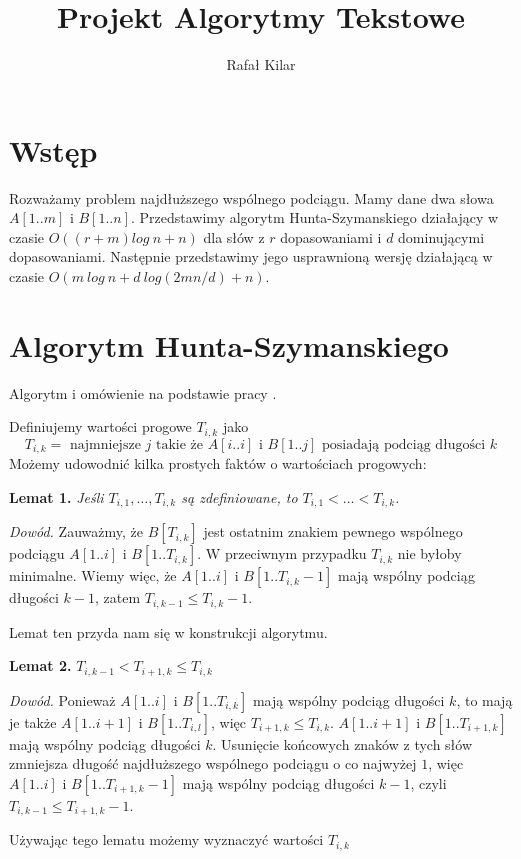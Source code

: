 \documentclass[11pt]{article}
\title{Projekt Algorytmy Tekstowe}
\author{Rafał Kilar}
\begin{document}
\maketitle

\section*{Wstęp}

Rozważamy problem najdłuższego wspólnego podciągu. Mamy dane dwa słowa $A[1..m]$ i $B[1..n]$. Przedstawimy algorytm Hunta-Szymanskiego działający w czasie $O((r+m) log\ n + n)$ dla słów z $r$ dopasowaniami i $d$ dominującymi dopasowaniami. Następnie przedstawimy jego usprawnioną wersję działającą w czasie $O(m\ log\ n + d\ log(2mn/d) + n)$.

\section*{Algorytm Hunta-Szymanskiego}

Algorytm i omówienie na podstawie pracy \cite{hunt1977fast}.

Definiujemy wartości progowe $T_{i,k}$ jako 
$$T_{i,k} = \text{ najmniejsze $j$ takie że $A[i..i]$ i $B[1..j]$ posiadają podciąg długości $k$}$$
Możemy udowodnić kilka prostych faktów o wartościach progowych:

\textbf{Lemat 1.} \textit{Jeśli $T_{i,1}, \dots, T_{i, k}$ są zdefiniowane, to $T_{i,1} < \dots < T_{i,k}$.}

\textit{Dowód.} Zauważmy, że $B[T_{i,k}]$ jest ostatnim znakiem pewnego wspólnego podciągu $A[1..i]$ i $B[1..T_{i,k}]$. W przeciwnym przypadku $T_{i,k}$ nie byłoby minimalne. Wiemy więc, że $A[1..i]$ i $B[1..T_{i,k}-1]$ mają wspólny podciąg długości $k-1$, zatem $T_{i,k-1} \le T_{i,k}-1$.

Lemat ten przyda nam się w konstrukcji algorytmu.

\textbf{Lemat 2.} $T_{i,k-1} < T_{i+1, k} \le T_{i,k}$

\textit{Dowód.} Ponieważ $A[1..i]$ i $B[1..T_{i,k}]$ mają wspólny podciąg długości $k$, to mają je także $A[1..i+1]$ i $B[1..T_{i,l}]$, więc $T_{i+1, k} \le T_{i,k}$. $A[1..i+1]$ i $B[1..T_{i+1,k}]$ mają wspólny podciąg długości $k$. Usunięcie końcowych znaków z tych słów zmniejsza długość najdłuższego wspólnego podciągu o co najwyżej $1$, więc $A[1..i]$ i $B[1..T_{i+1,k}-1]$ mają wspólny podciąg długości $k-1$, czyli $T_{i,k-1} \le T_{i+1,k} - 1$.

Używając tego lematu możemy wyznaczyć wartości $T_{i,k}$
\end{document}
